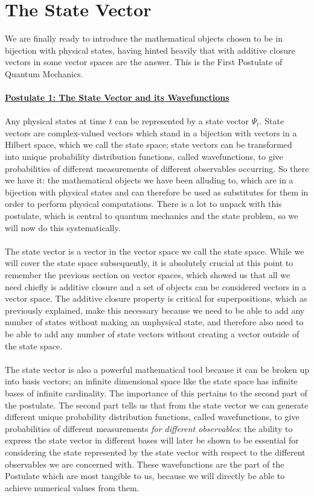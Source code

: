 \section{The State Vector}
We are finally ready to introduce the mathematical objects chosen to be in bijection with physical states, having hinted heavily that with additive closure vectors in some vector spaces are the answer. This is the First Postulate of Quantum Mechanics.
\\\\
\Answer
\underline{\textbf{Postulate 1: The State Vector and its Wavefunctions}}\\\\
Any physical states at time $t$ can be represented by a state vector $\Psi_{t}$. State vectors are complex-valued vectors which stand in a bijection with vectors in a Hilbert space, which we call the state space; state vectors can be transformed into unique probability distribution functions, called wavefunctions, to give probabilities of different measurements of different observables occurring.
\Answerend
So there we have it: the mathematical objects we have been alluding to, which are in a bijection with physical states and can therefore be used as substitutes for them in order to perform physical computations. There is a lot to unpack with this postulate, which is central to quantum mechanics and the state problem, so we will now do this systematically.
\\\\
The state vector is a vector in the vector space we call the state space. While we will cover the state space subsequently, it is absolutely crucial at this point to remember the previous section on vector spaces, which showed us that all we need chiefly is additive closure and a set of objects can be considered vectors in a vector space. The additive closure property is critical for superpositions, which as previously explained, make this necessary because we need to be able to add any number of states without making an unphysical state, and therefore also need to be able to add any number of state vectors without creating a vector outside of the state space.
\\\\
The state vector is also a powerful mathematical tool because it can be broken up into basis vectors; an infinite dimensional space like the state space has infinite bases of infinite cardinality. The importance of this pertains to the second part of the postulate. The second part tells us that from the state vector we can generate different unique probability distribution functions, called wavefunctions, to give probabilities of different measurements \textit{for different observables}: the ability to express the state vector in different bases will later be shown to be essential for considering the state represented by the state vector with respect to the different observables we are concerned with. These wavefunctions are the part of the Postulate which are most tangible to us, because we will directly be able to achieve numerical values from them. 
